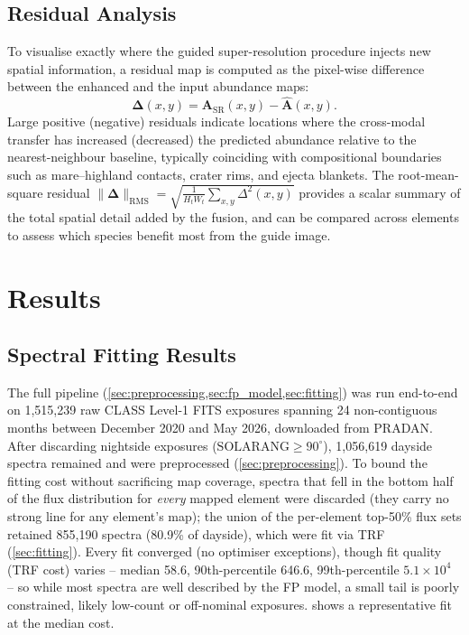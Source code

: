 \documentclass[journal,lettersize]{IEEEtran}
\begin{document}
\subsection{Residual Analysis}\label{sec:sr_residual}

To visualise exactly where the guided super-resolution procedure injects
new spatial information, a residual map is computed as the pixel-wise
difference between the enhanced and the input abundance maps:
\begin{equation}\label{eq:residual}
  \boldsymbol{\Delta}(x,y)
    = \mathbf{A}_{\mathrm{SR}}(x,y)
    - \hat{\mathbf{A}}(x,y).
\end{equation}
Large positive (negative) residuals indicate locations where the
cross-modal transfer has increased (decreased) the predicted abundance
relative to the nearest-neighbour baseline, typically coinciding with
compositional boundaries such as mare--highland contacts, crater rims,
and ejecta blankets.  The root-mean-square residual
$\|\boldsymbol{\Delta}\|_{\mathrm{RMS}} =
  \sqrt{\frac{1}{H_t W_t}\sum_{x,y}\Delta^2(x,y)}$
provides a scalar summary of the total spatial detail added by the
fusion, and can be compared across elements to assess which species
benefit most from the guide image.

\section{Results}\label{sec:results}

\subsection{Spectral Fitting Results}\label{sec:results_fitting}

The full pipeline (\cref{sec:preprocessing,sec:fp_model,sec:fitting}) was
run end-to-end on 1{,}515{,}239 raw CLASS Level-1 FITS exposures spanning
24 non-contiguous months between December 2020 and May 2026, downloaded
from PRADAN. After discarding nightside exposures
($\mathrm{SOLARANG} \geq 90^{\circ}$), 1{,}056{,}619 dayside spectra
remained and were preprocessed (\cref{sec:preprocessing}). To bound the
fitting cost without sacrificing map coverage, spectra that fell in the
bottom half of the flux distribution for \emph{every} mapped element were
discarded (they carry no strong line for any element's map); the union of
the per-element top-50\% flux sets retained 855{,}190 spectra (80.9\% of
dayside), which were fit via TRF (\cref{sec:fitting}). Every fit converged
(no optimiser exceptions), though fit quality (TRF cost) varies -- median
58.6, 90th-percentile 646.6, 99th-percentile $5.1\times10^{4}$ -- so while
most spectra are well described by the FP model, a small tail is poorly
constrained, likely low-count or off-nominal exposures.
 shows a representative fit at the median cost.
\end{document}
